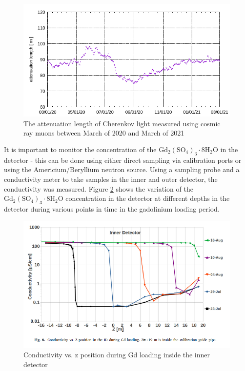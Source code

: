 \begin{figure}[H]
    \includegraphics[width=\textwidth]{Figures/attenuation_length_gd.png}
    \caption{The attenuation length of Cherenkov light measured using cosmic ray muons between March of 2020 and March of 2021}
    \label{fig:gdattenuationlength}
\end{figure}

It is important to monitor the concentration of the $\mathrm{Gd}_{2}\left(\mathrm{SO}_{4}\right)_{3} \cdot 8 \mathrm{H}_{2} \mathrm{O}$ in the detector - this can be done using either direct sampling via calibration ports or using the Americium/Beryllium neutron source. Using a sampling probe and a conductivity meter to take samples in the inner and outer detector, the conductivity was measured. Figure \ref{fig:gdconductivity} shows the variation of the $\mathrm{Gd}_{2}\left(\mathrm{SO}_{4}\right)_{3} \cdot 8 \mathrm{H}_{2} \mathrm{O}$ concentration in the detector at different depths in the detector during various points in time in the gadolinium loading period. 

\begin{figure}[H]
    \includegraphics[width=\textwidth]{Figures/gd_conductivity.png}
    \caption{Conductivity vs. z position during Gd loading inside the inner detector}
    \label{fig:gdconductivity}
\end{figure}


